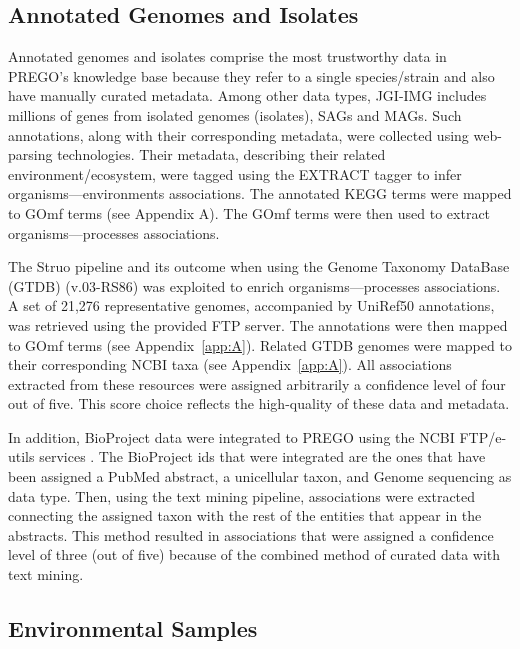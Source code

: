    \subsection{Annotated Genomes and Isolates}
   \label{subsec:prego-isolates}

   Annotated genomes and isolates comprise the most trustworthy data in PREGO's knowledge base because they refer to a single species/strain and also have manually curated metadata. 
   Among other data types, JGI-IMG \parencite{chen2021img, mukherjee2021genomes} includes millions of genes from isolated genomes (isolates), SAGs and MAGs. Such annotations, along with their corresponding metadata, were collected using web-parsing technologies. Their metadata, describing their related environment/ecosystem, were tagged using the EXTRACT tagger to infer organisms—environments associations. The annotated KEGG terms were mapped to GOmf terms (see Appendix A). The GOmf terms were then used to extract organisms—processes associations.
   
   The Struo pipeline \parencite{de2020struo} and its outcome when using the Genome Taxonomy DataBase (GTDB) (v.03-RS86) \parencite{parks2020complete} was exploited to enrich organisms—processes associations. 
   A set of 21,276 representative genomes, accompanied by UniRef50 annotations, was retrieved using the provided FTP server. The annotations were then mapped to GOmf terms (see Appendix~\ref{app:A}). 
   Related GTDB genomes were mapped to their corresponding NCBI taxa (see Appendix~\ref{app:A}). 
   All associations extracted from these resources were assigned arbitrarily a confidence level of four out of five. 
   This score choice reflects the high-quality of these data and metadata.
   
   In addition, BioProject data were integrated to PREGO using the NCBI FTP/e-utils services \parencite{sayers2021database}. 
   The BioProject ids that were integrated are the ones that have been assigned a PubMed abstract, a unicellular taxon, and Genome sequencing as data type. Then, using the text mining pipeline, associations were extracted connecting the assigned taxon with the rest of the entities that appear in the abstracts. This method resulted in associations that were assigned a confidence level of three (out of five) because of the combined method of curated data with text mining.


   \subsection{Environmental Samples}
   \label{subsec:prego-envsamples}

